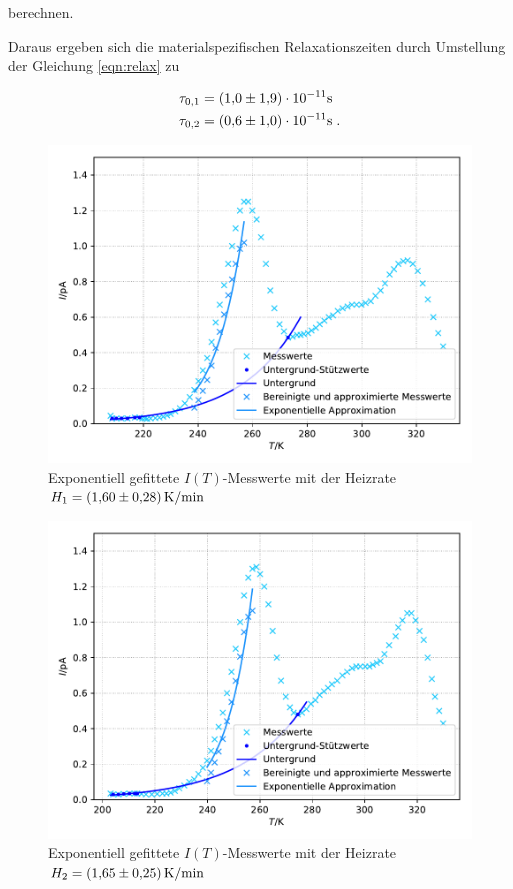 berechnen.

Daraus ergeben sich die materialspezifischen Relaxationszeiten durch Umstellung der Gleichung \eqref{eqn:relax} zu

\begin{align*}
  \tau_{0,1} &= (\num{1.0 +- 1.9}) \cdot 10^{-11} \si{\second}\\
  \tau_{0,2} &= (\num{0.6 +- 1.0}) \cdot 10^{-11} \si{\second} \; .
\end{align*}

\begin{figure}[H]
  \centering
  \includegraphics[scale=0.7]{content/plot1.pdf}
  \caption{Exponentiell gefittete $I(T)$-Messwerte mit der Heizrate $H_1 = \SI{1.60 +- 0.28}{\kelvin\per\minute}$}
  \label{fig:plot1}
\end{figure}

\begin{figure}[H]
  \centering
  \includegraphics[scale=0.7]{content/plot2.pdf}
  \caption{Exponentiell gefittete $I(T)$-Messwerte mit der Heizrate $H_2 = \SI{1.65 +- 0.25}{\kelvin\per\minute}$}
  \label{fig:plot2}
\end{figure}


